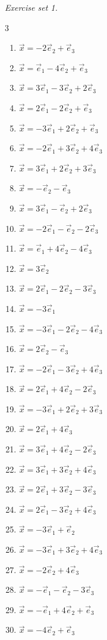 \par\noindent\emph{Exercise set 1.}\nopagebreak
\begin{multicols}{3}\raggedright
\begin{enumerate}[label=\arabic*., leftmargin=*, itemsep=1pt]
\item $\vec x=-2\vec e_2+\vec e_3$
\item $\vec x=\vec e_1-4\vec e_2+\vec e_3$
\item $\vec x=3\vec e_1-3\vec e_2+2\vec e_3$
\item $\vec x=2\vec e_1-2\vec e_2+\vec e_3$
\item $\vec x=-3\vec e_1+2\vec e_2+\vec e_3$
\item $\vec x=-2\vec e_1+3\vec e_2+4\vec e_3$
\item $\vec x=3\vec e_1+2\vec e_2+3\vec e_3$
\item $\vec x=-\vec e_2-\vec e_3$
\item $\vec x=3\vec e_1-\vec e_2+2\vec e_3$
\item $\vec x=-2\vec e_1-\vec e_2-2\vec e_3$
\item $\vec x=\vec e_1+4\vec e_2-4\vec e_3$
\item $\vec x=3\vec e_2$
\item $\vec x=2\vec e_1-2\vec e_2-3\vec e_3$
\item $\vec x=-3\vec e_1$
\item $\vec x=-3\vec e_1-2\vec e_2-4\vec e_3$
\item $\vec x=2\vec e_2-\vec e_3$
\item $\vec x=-2\vec e_1-3\vec e_2+4\vec e_3$
\item $\vec x=2\vec e_1+4\vec e_2-2\vec e_3$
\item $\vec x=-3\vec e_1+2\vec e_2+3\vec e_3$
\item $\vec x=2\vec e_1+4\vec e_3$
\item $\vec x=3\vec e_1+4\vec e_2-2\vec e_3$
\item $\vec x=3\vec e_1+3\vec e_2+4\vec e_3$
\item $\vec x=2\vec e_1+3\vec e_2-3\vec e_3$
\item $\vec x=2\vec e_1-3\vec e_2+4\vec e_3$
\item $\vec x=-3\vec e_1+\vec e_2$
\item $\vec x=-3\vec e_1+3\vec e_2+4\vec e_3$
\item $\vec x=-2\vec e_2+4\vec e_3$
\item $\vec x=-\vec e_1-\vec e_2-3\vec e_3$
\item $\vec x=-\vec e_1+4\vec e_2+\vec e_3$
\item $\vec x=-4\vec e_2+\vec e_3$
\end{enumerate}
\end{multicols}
